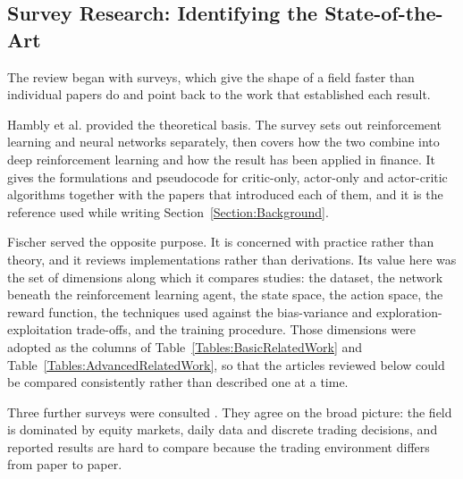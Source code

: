 \subsection{Survey Research: Identifying the State-of-the-Art}

The review began with surveys, which give the shape of a field faster than individual papers do and point back to the work that established each result.

Hambly et al. \cite{hambly_recent_2023} provided the theoretical basis. The survey sets out reinforcement learning and neural networks separately, then covers how the two combine into deep reinforcement learning and how the result has been applied in finance. It gives the formulations and pseudocode for critic-only, actor-only and actor-critic algorithms together with the papers that introduced each of them, and it is the reference used while writing Section~\ref{Section:Background}.

Fischer \cite{fischer_reinforcement_2018} served the opposite purpose. It is concerned with practice rather than theory, and it reviews implementations rather than derivations. Its value here was the set of dimensions along which it compares studies: the dataset, the network beneath the reinforcement learning agent, the state space, the action space, the reward function, the techniques used against the bias-variance and exploration-exploitation trade-offs, and the training procedure. Those dimensions were adopted as the columns of Table~\ref{Tables:BasicRelatedWork} and Table~\ref{Tables:AdvancedRelatedWork}, so that the articles reviewed below could be compared consistently rather than described one at a time.

Three further surveys were consulted \cite{pricope_deep_2021, alameer_reinforcement_2022, meng_reinforcement_2019}. They agree on the broad picture: the field is dominated by equity markets, daily data and discrete trading decisions, and reported results are hard to compare because the trading environment differs from paper to paper.